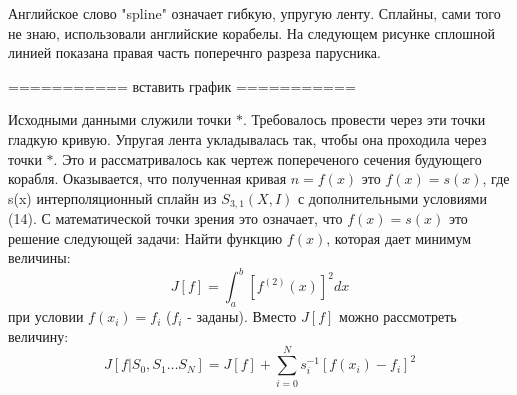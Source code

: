 Английское слово "spline" означает гибкую, упругую ленту. Сплайны, сами того не знаю, использовали английские корабелы. На следующем рисунке сплошной линией показана правая часть поперечнго разреза парусника. 

===========
вставить график
===========

Исходными данными служили точки $\ast$. Требовалось провести через эти точки гладкую кривую. Упругая лента укладывалась так, чтобы она проходила через точки $\ast$. Это и рассматривалось как чертеж попереченого сечения будующего корабля. Оказывается, что полученная кривая $n=f(x)$ это $f(x)=s(x)$, где s(x) интерполяционный сплайн из $S_{3,1}(X,I)$ с дополнительными условиями (14).
С математической точки зрения это означает, что $f(x)=s(x)$ это решение следующей задачи: Найти функцию $f(x)$, которая дает минимум величины:
\begin{equation}
J[f]=\int_a^b[f^{(2)}(x)]^2dx
\end{equation}
при условии $f(x_i)=f_i$ ($f_i$ - заданы).
Вместо $J[f]$ можно рассмотреть величину:
\begin{equation}
J[ f| S_{0},S_1\ldots S_{N}] = J \left[ f\right] + \sum ^{N}_{i=0}s^{-1}_{i}\left[ f\left( x_{i}\right) -f_{i}\right] ^{2}
\end{equation}
